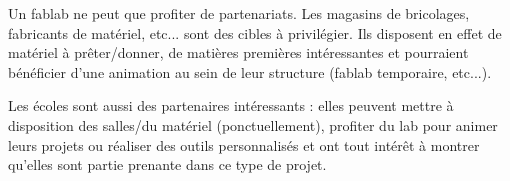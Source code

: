 Un fablab ne peut que profiter de partenariats. Les magasins de bricolages, fabricants de matériel, etc... sont des
cibles à privilégier. Ils disposent en effet de matériel à prêter/donner, de matières premières intéressantes et
pourraient bénéficier d'une animation au sein de leur structure (fablab temporaire, etc...).

Les écoles sont aussi des partenaires intéressants : elles peuvent mettre à disposition des salles/du matériel
(ponctuellement), profiter du lab pour animer leurs projets ou réaliser des outils personnalisés et ont tout intérêt à
montrer qu'elles sont partie prenante dans ce type de projet.

